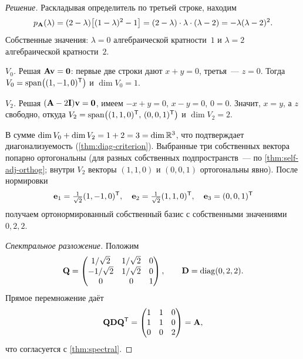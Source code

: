 \begin{proof}[Решение]
Раскладывая определитель по третьей строке, находим
\[
  p_{\mathbf{A}}(\lambda) = (2 - \lambda)\bigl[(1 - \lambda)^2 - 1\bigr]
  = (2 - \lambda) \cdot \lambda \cdot (\lambda - 2)
  = -\lambda(\lambda - 2)^2.
\]
Собственные значения: $\lambda = 0$ алгебраической кратности~$1$ и
$\lambda = 2$ алгебраической кратности~$2$.

\emph{$V_0$.} Решая $\mathbf{A}\mathbf{v} = \mathbf{0}$: первые две строки
дают $x + y = 0$, третья~--- $z = 0$. Тогда $V_0 = \operatorname{span}\bigl((1, -1, 0)^{\mathsf{T}}\bigr)$
и $\dim V_0 = 1$.

\emph{$V_2$.} Решая $(\mathbf{A} - 2\mathbf{I})\mathbf{v} = \mathbf{0}$, имеем
$-x + y = 0$, $x - y = 0$, $0 = 0$. Значит, $x = y$, а $z$
свободно, откуда $V_2 = \operatorname{span}\bigl((1, 1, 0)^{\mathsf{T}},\, (0, 0, 1)^{\mathsf{T}}\bigr)$ и
$\dim V_2 = 2$.

В сумме $\dim V_0 + \dim V_2 = 1 + 2 = 3 = \dim \mathbb{R}^3$, что
подтверждает диагонализуемость (\cref{thm:diag-criterion}). Выбранные
три собственных вектора попарно ортогональны (для разных собственных
подпространств~--- по \cref{thm:self-adj-orthog}; внутри $V_2$
векторы $(1, 1, 0)$ и $(0, 0, 1)$ ортогональны явно). После нормировки
\[
  \mathbf{e}_1 = \tfrac{1}{\sqrt{2}}(1, -1, 0)^{\mathsf{T}},\quad
  \mathbf{e}_2 = \tfrac{1}{\sqrt{2}}(1, 1, 0)^{\mathsf{T}},\quad
  \mathbf{e}_3 = (0, 0, 1)^{\mathsf{T}}
\]
получаем ортонормированный собственный базис с собственными
значениями $0, 2, 2$.

\emph{Спектральное разложение.} Положим
\[
  \mathbf{Q} = \begin{pmatrix}
    1/\sqrt{2} & 1/\sqrt{2} & 0 \\
    -1/\sqrt{2} & 1/\sqrt{2} & 0 \\
    0 & 0 & 1
  \end{pmatrix}, \qquad
  \mathbf{D} = \operatorname{diag}(0, 2, 2).
\]
Прямое перемножение даёт
\[
  \mathbf{Q}\mathbf{D}\mathbf{Q}^{\mathsf{T}} = \begin{pmatrix}
    1 & 1 & 0 \\
    1 & 1 & 0 \\
    0 & 0 & 2
  \end{pmatrix} = \mathbf{A},
\]
что согласуется с \cref{thm:spectral}.
\end{proof}
